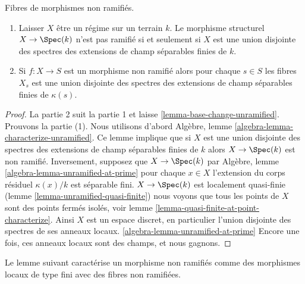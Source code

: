\begin{lemma}

\label{lemma-unramified-over-field}

Fibres de morphismes non ramifiés.

\begin{enumerate}

\item Laisser $X$ être un régime sur un terrain $k$. Le morphisme structurel $X \to \Spec(k)$ n'est pas ramifié si et seulement si $X$ est une union disjointe des spectres des extensions de champ séparables finies de $k$.
\item Si $f : X \to S$ est un morphisme non ramifié alors pour chaque $s \in S$
les fibres $X_s$ est une union disjointe des spectres des extensions de champ séparables finies de $\kappa(s)$.

\end{enumerate}

\end{lemma}

\begin{proof}

La partie 2 suit la partie 1 et laisse \ref{lemma-base-change-unramified}. Prouvons la partie (1). Nous utilisons d'abord Algèbre, lemme \ref{algebra-lemma-characterize-unramified}. Ce lemme implique que si $X$ est une union disjointe des spectres des extensions de champ séparables finies de $k$ alors $X \to \Spec(k)$ est non ramifié. Inversement, supposez que $X \to \Spec(k)$ par Algèbre, lemme \ref{algebra-lemma-unramified-at-prime} pour chaque $x \in X$
l'extension du corps résiduel $\kappa(x)/k$ est séparable fini. $X \to \Spec(k)$ est localement quasi-finie (lemme \ref{lemma-unramified-quasi-finite}) nous voyons que tous les points de $X$ sont des points fermés isolés, voir lemme \ref{lemma-quasi-finite-at-point-characterize}. Ainsi $X$ est un espace discret, en particulier l'union disjointe des spectres de ses anneaux locaux. \ref{algebra-lemma-unramified-at-prime} Encore une fois, ces anneaux locaux sont des champs, et nous gagnons.

\end{proof}

\noindent
Le lemme suivant caractérise un morphisme non ramifiés comme des morphismes locaux de type fini avec des fibres non ramifiées.

